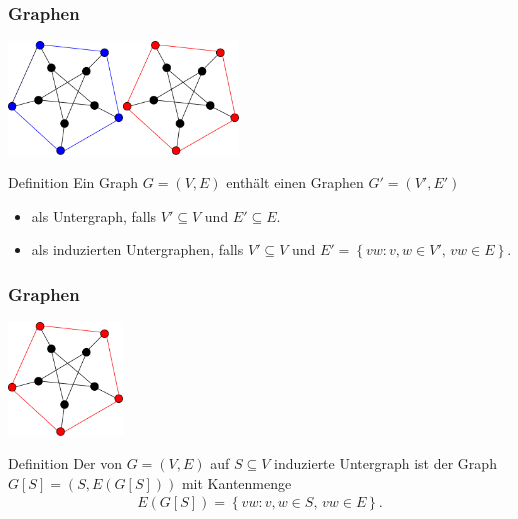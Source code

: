 \documentclass[aspectratio=1610, 11pt]{beamer}
\newcommand\cbc[1]{\left\{{#1}\right\}}
\newcommand{\mytitle}{Graphen}
\begin{document}
\begin{frame}\frametitle{\mytitle}
	\begin{overprint}
\includegraphics[height=30mm]{images/subgraphNonInduced.pdf}\hfill\includegraphics[height=30mm]{images/subgraph.pdf}
	\begin{block}{Definition}
		Ein Graph $G=(V,E)$ enth\"alt einen Graphen $G'=(V',E')$
		\begin{itemize}
			\item als \alert{Untergraph}, falls $V'\subseteq V$ und $E'\subseteq E$.
			\item als \alert{induzierten Untergraphen}, falls $V'\subseteq V$ und $E'=\cbc{vw:v,w\in V',\,vw\in E}.$
		\end{itemize}
	\end{block}
	\end{overprint}
\end{frame}

\begin{frame}\frametitle{\mytitle}
	\begin{overprint}
		\onslide<1>
\hfill\includegraphics[height=30mm]{images/subgraph.pdf}
	\begin{block}{Definition}
		Der von $G=(V,E)$ auf $S\subseteq V$ \alert{induzierte Untergraph} ist der Graph $G[S]=(S,E(G[S]))$ mit Kantenmenge
				\begin{align*}
					E(G[S])=\cbc{vw:v,w\in S,\,vw\in E}.
				\end{align*}
	\end{block}
	\end{overprint}
\end{frame}
\end{document}
